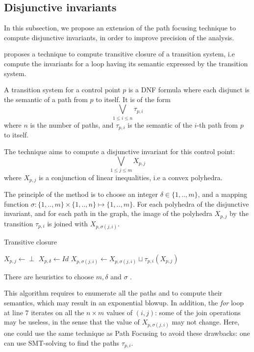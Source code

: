 \documentclass[a4paper,english,titlepage,11pt]{report}
\begin{document}
	\subsection{Disjunctive invariants}

	In this subsection, we propose an extension of the path focusing technique
	to compute disjunctive invariants, in order to improve precision of the
	analysis.

	\cite{GulwaniZ10} proposes a technique to compute transitive closure of a
	transition system, i.e compute the invariants for a loop having its semantic
	expressed by the transition system.

	A transition system for a control point $p$ is a DNF formula where each
	disjunct is the semantic of a path from $p$ to itself. It is of the form
	$$\bigvee_{1 \leq i \leq n} \tau_{p,i}$$ where $n$ is the number of
	paths, and $\tau_{p,i}$ is the semantic of the $i$-th path from $p$ to itself.

	The technique aims to compute a disjunctive invariant for this control
	point: 
	$$\displaystyle\bigvee_{1 \leq j \leq m} X_{p,j}$$
	where $X_{p,j}$ is a conjunction of linear inequalities, i.e a convex
	polyhedra.

	The principle of the method is to
	choose an integer $\delta \in \{1,..,m\}$, and a mapping function
	$\sigma: \{1,..,m\} \times \{1,..,n\} \mapsto \{1,..,m\}$.
	For each polyhedra of the disjunctive invariant, and for each path in the
	graph, the image of the polyhedra $X_{p,j}$ by the transition
	$\tau_{p,i}$ is joined with $X_{p,\sigma(j,i)}$.

\begin{algorithm}
\caption{Transitive closure}\label{gulwani}
\begin{algorithmic}[1] 
	\State $X_{p,j} \gets \perp$
\EndFor
\State $X_{p,\delta} \gets Id$
\Repeat
		\State $X_{p,\sigma(j,i)} \gets X_{p,\sigma(j,i)} \sqcup
		\tau_{p,i}(X_{p,j})$
	\EndFor
{}
\EndProcedure
\end{algorithmic}
\end{algorithm}

There are heuristics to choose $m,\delta$ and $\sigma$ \cite[Section
5]{GulwaniZ10}.

This algorithm requires to enumerate all the paths and to compute their
semantics, which may result in an exponential blowup. In addition, the
\emph{for} loop at line $7$ iterates on all the $n \times m$ values of $(i,j)$:
some of the join operations may be useless, in the sense that the value of 
$X_{p,\sigma(j,i)}$ may not change. Here, one could use the same technique as
Path Focusing to avoid these drawbacks: one can use SMT-solving to find the
paths $\tau_{p,i}$.
\end{document}
